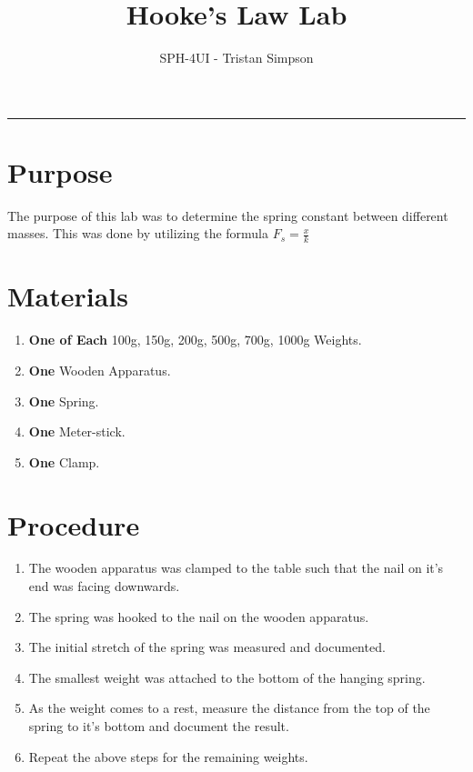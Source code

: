 \documentclass{article}
\title{Hooke's Law Lab}
\author{SPH-4UI - Tristan Simpson}
\begin{document}
\maketitle

\vspace{0.5cm}
\hrule
\vspace{0.5cm}
\section*{Purpose}
The purpose of this lab was to determine the spring constant between different masses.
This was done by utilizing the formula $F_{s} = \frac{x}{k}$

\section*{Materials}
\begin{enumerate}
    \item {\textbf{One of Each} 100g, 150g, 200g, 500g, 700g, 1000g Weights.}
    \item {\textbf{One} Wooden Apparatus.}
    \item {\textbf{One} Spring.}
    \item {\textbf{One} Meter-stick.}
    \item {\textbf{One} Clamp.}
\end{enumerate}

\section*{Procedure}
\begin{enumerate}
    \item {The wooden apparatus was clamped to the table such that the nail on it's end was facing downwards.}
    \item {The spring was hooked to the nail on the wooden apparatus.}
    \item {The initial stretch of the spring was measured and documented.}
    \item {The smallest weight was attached to the bottom of the hanging spring.}
    \item {As the weight comes to a rest, measure the distance from the top of the spring to it's bottom and document the result.}
    \item {Repeat the above steps for the remaining weights.}
\end{enumerate}\leavevmode
\end{document}
